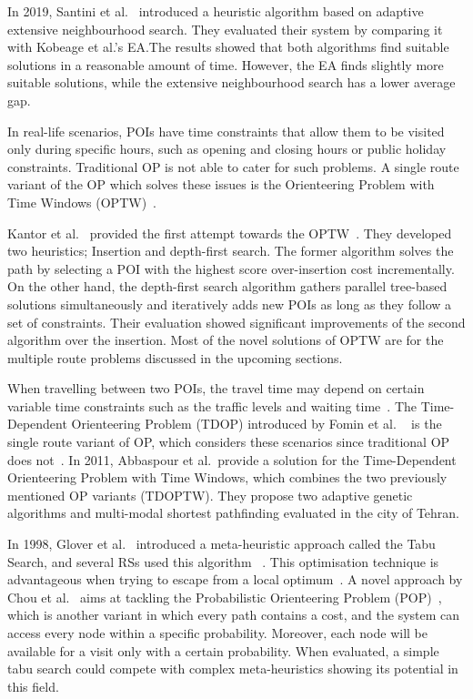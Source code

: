 In 2019, Santini et al.~\cite{Santini2019} introduced a heuristic algorithm based on
adaptive extensive neighbourhood search. They evaluated their system by
comparing it with Kobeage et al.'s EA.\@ The results showed that both algorithms
find suitable solutions in a reasonable amount of time. However, the EA finds
slightly more suitable solutions, while the extensive neighbourhood search has
a lower average gap.

In real-life scenarios, POIs have time constraints that allow them to be
visited only during specific hours, such as opening and closing hours or public
holiday constraints. Traditional OP is not able to cater for such problems. A
single route variant of the OP which solves these issues is the Orienteering
Problem with Time Windows (OPTW)~\cite{Gavalas2014a}. 

Kantor et al.~\cite{Kantor1992} provided the first attempt towards the
OPTW~\cite{Vansteenwegen2011}. They developed two heuristics;
Insertion and depth-first search. The former algorithm solves the path by
selecting a POI with the highest score over-insertion cost incrementally. On
the other hand, the depth-first search algorithm gathers parallel tree-based
solutions simultaneously and iteratively adds new POIs as long as they follow a
set of constraints. Their evaluation showed significant improvements of the
second algorithm over the insertion. Most of the novel solutions of OPTW are
for the multiple route problems discussed in the upcoming sections. 

When travelling between two POIs, the travel time may depend on certain
variable time constraints such as the traffic levels and waiting time~\cite{Herzog2020}.
The Time-Dependent Orienteering Problem (TDOP) introduced by Fomin et al.
~\cite{Fomin2002} is the single route variant of OP, which considers
these scenarios since traditional OP does not~\cite{Gunawan2016}. In 2011, Abbaspour et
al.~\cite{Abbaspour2011}provide a solution for the
Time-Dependent Orienteering Problem with Time Windows, which combines the two
previously mentioned OP variants (TDOPTW).  They propose two adaptive genetic
algorithms and multi-modal shortest pathfinding evaluated in the city of
Tehran.

In 1998, Glover et al.~\cite{Glover1998} introduced a meta-heuristic approach called the
Tabu Search, and several RSs used this algorithm
~\cite{Tang2005,Sylejmani2012,Chou2021}. This optimisation technique is
advantageous when trying to escape
from a local optimum~\cite{Chou2021}. A novel approach by Chou et al.~\cite{Chou2021} aims at
tackling the Probabilistic Orienteering Problem (POP)~\cite{POP}, which
is another variant in which every path contains a cost, and the system can
access every node within a specific probability. Moreover, each node will be
available for a visit only with a certain probability. When evaluated, a simple
tabu search could compete with complex meta-heuristics showing its potential in
this field.



